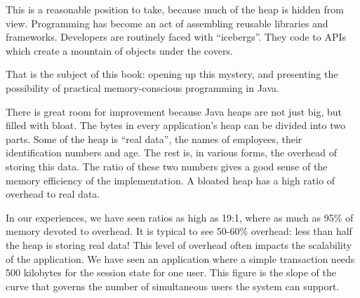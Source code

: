 This is a reasonable position to take, because much of the heap is hidden from
view. Programming has become an act of assembling reusable libraries and
frameworks. Developers are routinely faced with ``icebergs''. They code to APIs
which create a mountain of objects under the covers.

That is the subject of this book: opening up this mystery, and presenting the
possibility of practical memory-conscious programming in Java.

There is great room for improvement because Java heaps are not just big, but
filled with bloat. The bytes in every application's heap can be divided into two
parts. Some of the heap is ``real data'', the names of employees, their
identification numbers and age. The rest is, in various forms, the overhead of
storing this data. The ratio of these two numbers gives a good sense of the
memory efficiency of the implementation. A bloated heap has a high ratio of
overhead to real data.

In our experiences, we have seen ratios as high as 19:1, where as much as 95\%
of memory devoted to overhead. It is typical to see 50-60\% overhead: less than
half the heap is storing real data!
This level of overhead often impacts the scalability of the application. We have
seen an application where a simple transaction needs 500 kilobytes for the
session state for one user. This figure is the slope of the curve that governs
the number of simultaneous users the system can support.


